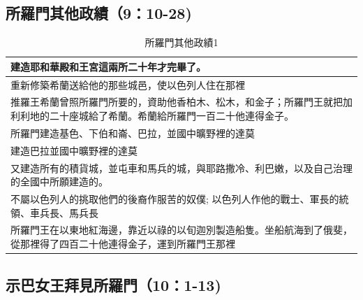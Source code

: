 \documentclass{ctexart}
\begin{document}
\subsection{所羅門其他政績（9：10-28)}
\begin{table}[!hbp]
\centering 
\begin{tabular}{|p{16cm}|}
\hline
\hline
 建造耶和華殿和王宮這兩所二十年才完畢了。\\\hline
 重新修築希蘭送給他的那些城邑，使以色列人住在那裡  \\\hline
 推羅王希蘭曾照所羅門所要的，資助他香柏木、松木，和金子；所羅門王就把加利利地的二十座城給了希蘭。希蘭給所羅門一百二十他連得金子。\\\hline
 所羅門建造基色、下伯和崙、巴拉，並國中曠野裡的達莫 \\\hline
 建造巴拉並國中曠野裡的達莫\\\hline
 又建造所有的積貨城，並屯車和馬兵的城，與耶路撒冷、利巴嫩，以及自己治理的全國中所願建造的。\\\hline
 不屬以色列人的挑取他們的後裔作服苦的奴僕; 以色列人作他的戰士、軍長的統領、車兵長、馬兵長
 \\\hline
所羅門王在以東地紅海邊，靠近以祿的以旬迦別製造船隻。坐船航海到了俄斐，從那裡得了四百二十他連得金子，運到所羅門王那裡\\\hline
 \end{tabular}
\caption{所羅門其他政績1}
\end{table}


	 
\subsection{示巴女王拜見所羅門（10：1-13)}
\end{document}
